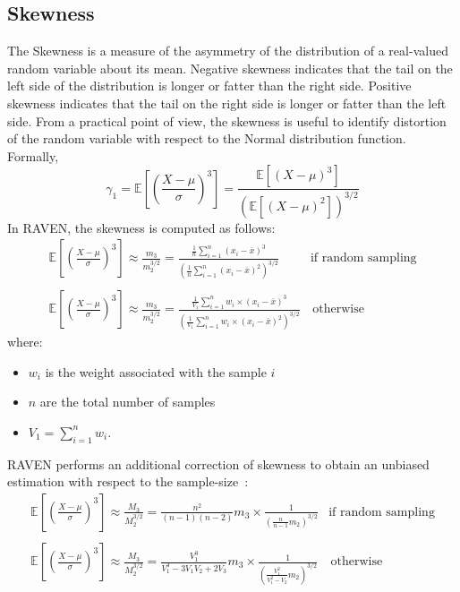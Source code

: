 \subsection{Skewness}
The Skewness is a measure of the asymmetry of the distribution of a
real-valued random variable about its mean. Negative skewness
indicates that the tail on the left side of the distribution is longer or fatter
than the right side.  Positive skewness indicates that the tail on the right
side is longer or fatter than the left side. From a practical point of view, the
skewness is useful to identify distortion  of the random variable with respect to
the Normal distribution function.
\\Formally,
\begin{equation}
\gamma_{1} = \mathbb{E} \left [ \left ( \frac{X-\mu}{\sigma} \right )^{3} \right ] = \frac{ \mathbb{E}\left [ \left ( X-\mu \right )^{3} \right ]}{\left ( \mathbb{E}\left [ \left ( X-\mu \right )^{2} \right ] \right )^{3/2}}
\end{equation}
In RAVEN, the skewness is computed as follows:
\begin{equation}
\begin{matrix}
\mathbb{E} \left [ \left ( \frac{X-\mu}{\sigma} \right )^{3} \right ]  \approx \frac{m_{3}}{m_{2}^{3/2}} = \frac{  \frac{1}{n} \sum_{i=1}^{n}  (x_{i} - \overline{x})^{3} }{\left ( \frac{1}{n} \sum_{i=1}^{n}  (x_{i} - \overline{x})^{2} \right )^{3/2}} & \text{if random sampling}
\\
\\
\mathbb{E} \left [ \left ( \frac{X-\mu}{\sigma} \right )^{3} \right ]  \approx \frac{m_{3}}{m_{2}^{3/2}} = \frac{  \frac{1}{V_{1}} \sum_{i=1}^{n} w_{i} \times (x_{i} - \overline{x})^{3} }{\left ( \frac{1}{V_{1}} \sum_{i=1}^{n}  w_{i} \times (x_{i} - \overline{x})^{2} \right )^{3/2}} &  \, \text{otherwise}
\end{matrix}
\end{equation}
where:
\begin{itemize}
  \item $w_{i}$ is the weight associated with the sample $i$
  \item $n$ are the total number of samples
  \item $V_{1} = \sum_{i=1}^{n} w_{i}$.
\end{itemize}
RAVEN performs an additional correction of skewness to obtain an unbiased estimation  with respect to the sample-size~\cite{RimoldiniUnbiased}:
\begin{equation}
\begin{matrix}
\mathbb{E} \left [ \left ( \frac{X-\mu}{\sigma} \right )^{3} \right ]  \approx \frac{M_{3}}{M_{2}^{3/2}}  = \displaystyle \frac{n^{2}}{(n-1)(n-2)}m_{3}\times \frac{1}{\left ( \displaystyle \frac{n}{n-1}m_{2}  \right )^{3/2}} & \text{if random sampling}
\\
\\
\mathbb{E} \left [ \left ( \frac{X-\mu}{\sigma} \right )^{3} \right ]  \approx \frac{M_{3}}{M_{2}^{3/2}}  = \displaystyle \frac{V_{1}^{3}}{V_{1}^{3}-3V_{1}V_{2}+2V_{3}}m_{3} \times \frac{1}{\left ( \displaystyle \frac{V_{1}^{2}}{V_{1}^{2}-V_{2}}m_{2}  \right )^{3/2}} &  \,  \text{otherwise}
\end{matrix}
\end{equation}

